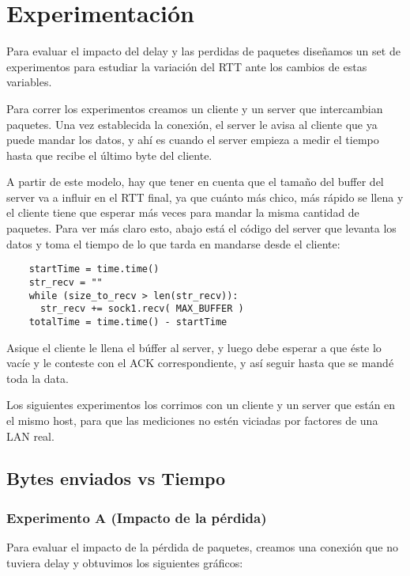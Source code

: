 \section{Experimentaci\'on}

Para evaluar el impacto del delay y las perdidas de paquetes dise\~namos un set de experimentos para estudiar la variaci\'on del RTT ante los cambios de estas variables. 

Para correr los experimentos creamos un cliente y un server que intercambian paquetes. Una vez establecida la conexi\'on, el server le avisa al cliente que ya puede mandar los datos, y ah\'i es cuando el server empieza a medir el tiempo hasta que recibe el \'ultimo byte del cliente. 

A partir de este modelo, hay que tener en cuenta que el tama\~no del buffer del server va a influir en el RTT final, ya que cu\'anto m\'as chico, m\'as r\'apido se llena y el cliente tiene que esperar m\'as veces para mandar la misma cantidad de paquetes. Para ver m\'as claro esto, abajo est\'a el c\'odigo del server que levanta los datos y toma el tiempo de lo que tarda en mandarse desde el cliente: 

\begin{verbatim}
    startTime = time.time()
    str_recv = ""
    while (size_to_recv > len(str_recv)):
      str_recv += sock1.recv( MAX_BUFFER )
    totalTime = time.time() - startTime
\end{verbatim}

Asique el cliente le llena el b\'uffer al server, y luego debe esperar a que \'este lo vac\'ie y le conteste con el ACK correspondiente, y as\'i seguir hasta que se mand\'e toda la data. 

Los siguientes experimentos los corrimos con un cliente y un server que est\'an en el mismo host, para que las mediciones no est\'en viciadas por factores de una LAN real.

\subsection{Bytes enviados vs Tiempo}
\subsubsection{Experimento A (Impacto de la p\'erdida)}

  Para evaluar el impacto de la p\'erdida de paquetes, creamos una conexi\'on que no tuviera delay y obtuvimos los siguientes gr\'aficos: 
  
